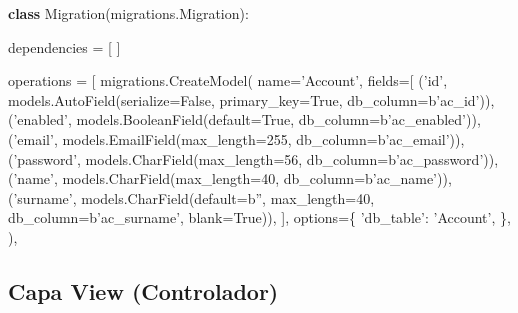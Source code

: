 \documentclass[12pt,a4paperpaper,]{report}
\newenvironment{Shaded}{}{}
\newcommand{\KeywordTok}[1]{\textcolor[rgb]{0.00,0.44,0.13}{\textbf{#1}}}
\newcommand{\DecValTok}[1]{\textcolor[rgb]{0.25,0.63,0.44}{#1}}
\newcommand{\StringTok}[1]{\textcolor[rgb]{0.25,0.44,0.63}{#1}}
\newcommand{\VariableTok}[1]{\textcolor[rgb]{0.10,0.09,0.49}{#1}}
\newcommand{\OperatorTok}[1]{\textcolor[rgb]{0.40,0.40,0.40}{#1}}
\newcommand{\NormalTok}[1]{#1}
\begin{document}
\begin{Shaded}
\begin{Highlighting}[]

\KeywordTok{class}\NormalTok{ Migration(migrations.Migration):}

\NormalTok{    dependencies }\OperatorTok{=}\NormalTok{ [}
\NormalTok{    ]}

\NormalTok{    operations }\OperatorTok{=}\NormalTok{ [}
\NormalTok{        migrations.CreateModel(}
\NormalTok{            name}\OperatorTok{=}\StringTok{'Account'}\NormalTok{,}
\NormalTok{            fields}\OperatorTok{=}\NormalTok{[}
\NormalTok{                (}\StringTok{'id'}\NormalTok{, models.AutoField(serialize}\OperatorTok{=}\VariableTok{False}\NormalTok{, primary_key}\OperatorTok{=}\VariableTok{True}\NormalTok{, db_column}\OperatorTok{=}\NormalTok{b}\StringTok{'ac_id'}\NormalTok{)),}
\NormalTok{                (}\StringTok{'enabled'}\NormalTok{, models.BooleanField(default}\OperatorTok{=}\VariableTok{True}\NormalTok{, db_column}\OperatorTok{=}\NormalTok{b}\StringTok{'ac_enabled'}\NormalTok{)),}
\NormalTok{                (}\StringTok{'email'}\NormalTok{, models.EmailField(max_length}\OperatorTok{=}\DecValTok{255}\NormalTok{, db_column}\OperatorTok{=}\NormalTok{b}\StringTok{'ac_email'}\NormalTok{)),}
\NormalTok{                (}\StringTok{'password'}\NormalTok{, models.CharField(max_length}\OperatorTok{=}\DecValTok{56}\NormalTok{, db_column}\OperatorTok{=}\NormalTok{b}\StringTok{'ac_password'}\NormalTok{)),}
\NormalTok{                (}\StringTok{'name'}\NormalTok{, models.CharField(max_length}\OperatorTok{=}\DecValTok{40}\NormalTok{, db_column}\OperatorTok{=}\NormalTok{b}\StringTok{'ac_name'}\NormalTok{)),}
\NormalTok{                (}\StringTok{'surname'}\NormalTok{, models.CharField(default}\OperatorTok{=}\NormalTok{b}\StringTok{''}\NormalTok{, max_length}\OperatorTok{=}\DecValTok{40}\NormalTok{, db_column}\OperatorTok{=}\NormalTok{b}\StringTok{'ac_surname'}\NormalTok{, blank}\OperatorTok{=}\VariableTok{True}\NormalTok{)),}
\NormalTok{            ],}
\NormalTok{            options}\OperatorTok{=}\NormalTok{\{}
                \StringTok{'db_table'}\NormalTok{: }\StringTok{'Account'}\NormalTok{,}
\NormalTok{            \},}
\NormalTok{        ),}
\end{Highlighting}
\end{Shaded}

\subsection{Capa View (Controlador)}\label{capa-view-controlador}
\end{document}
